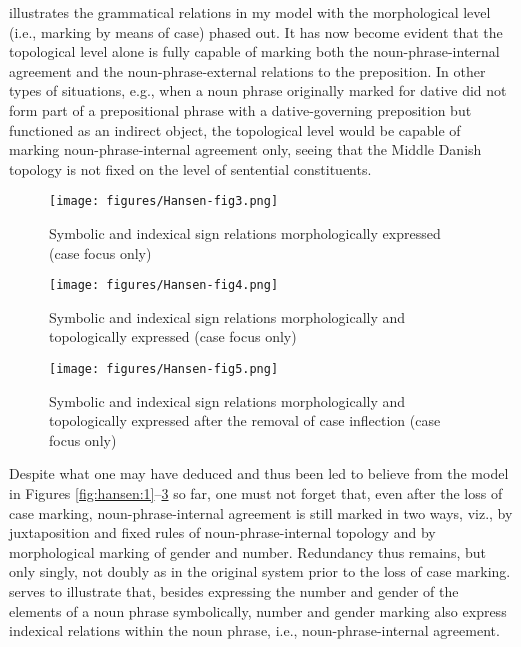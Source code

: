 \documentclass[output=paper]{langsci/langscibook}
\begin{document}
 illustrates the grammatical relations in my model with the morphological level (i.e., marking by means of case) phased out. It has now become evident that the topological level alone is fully capable of marking both the noun-phrase-internal agreement and the noun-phrase-external relations to the preposition. In other types of situations, e.g., when a noun phrase originally marked for dative did not form part of a prepositional phrase with a dative-governing preposition but functioned as an indirect object, the topological level would be capable of marking noun-phrase-internal agreement only, seeing that the Middle Danish topology is not fixed on the level of sentential constituents.


\begin{figure}
	\caption{Symbolic and indexical sign relations morphologically expressed (case focus only)\label{fig:hansen:3}}
	\texttt{[image: figures/Hansen-fig3.png]}
\end{figure}


\begin{figure}
	\caption{Symbolic and indexical sign relations morphologically and topologically expressed (case focus only)\label{fig:hansen:4}}
	\texttt{[image: figures/Hansen-fig4.png]}
\end{figure}

\begin{figure}
	\caption{Symbolic and indexical sign relations morphologically and topologically expressed after the removal of case inflection (case focus only)\label{fig:hansen:5}}
	\texttt{[image: figures/Hansen-fig5.png]}
\end{figure}


Despite what one may have deduced and thus been led to believe from the model in Figures \ref{fig:hansen:1}--\ref{fig:hansen:5} so far, one must not forget that, even after the loss of case marking, noun-phrase-internal agreement is still marked in two ways, viz., by juxtaposition and fixed rules of noun-phrase-internal topology and by morphological marking of gender and number. Redundancy thus remains, but only singly, not doubly as in the original system prior to the loss of case marking.  serves to illustrate that, besides expressing the number and gender of the elements of a noun phrase symbolically, number and gender marking also express indexical relations within the noun phrase, i.e., noun-phrase-internal agreement.
\end{document}
